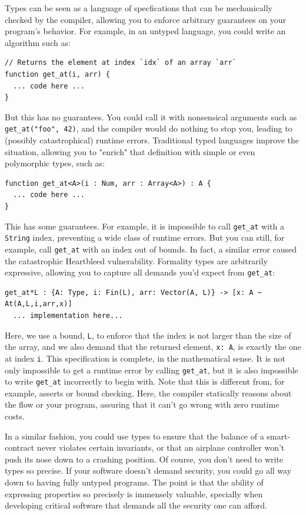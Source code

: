 \documentclass{article}
\theoremstyle{definition}
\theoremstyle{theorem}
\begin{document}
Types can be seen as a language of specfications that can be mechanically
checked by the compiler, allowing you to enforce arbitrary guarantees on your
program's behavior. For example, in an untyped language, you could write an
algorithm such as:

\begin{lstlisting}
// Returns the element at index `idx` of an array `arr`
function get_at(i, arr) {
  ... code here ...
}
\end{lstlisting}

But this has no guarantees. You could call it with nonsensical arguments such as
\verb|get_at("foo", 42)|, and the compiler would do nothing to stop you, leading
to (possibly catastrophical) runtime errors. Traditional typed languages improve
the situation, allowing you to "enrich" that definition with simple or even
polymorphic types, such as:

\begin{lstlisting}
function get_at<A>(i : Num, arr : Array<A>) : A {
  ... code here ...
}
\end{lstlisting}

This has some guarantees. For example, it is impossible to call \verb|get_at|
with a \verb|String| index, preventing a wide class of runtime errors. But you
can still, for example, call \verb|get_at| with an index out of bounds. In fact,
a similar error caused the catastrophic Heartbleed vulnerability. Formality
types are arbitrarily expressive, allowing you to capture all demands you'd
expect from \verb|get_at|:

\begin{lstlisting}
get_at*L : {A: Type, i: Fin(L), arr: Vector(A, L)} -> [x: A ~ At(A,L,i,arr,x)]
  ... implementation here...
\end{lstlisting}

Here, we use a bound, \verb|L|, to enforce that the index is not larger than the
size of the array, and we also demand that the returned element, \verb|x: A|, is
exactly the one at index \verb|i|. This specification is complete, in the
mathematical sense. It is not only impossible to get a runtime error by calling
\verb|get_at|, but it is also impossible to write \verb|get_at| incorrectly to
begin with.  Note that this is different from, for example, asserts or bound
checking.  Here, the compiler statically reasons about the flow or your program,
assuring that it can't go wrong with zero runtime costs.

In a similar fashion, you could use types to ensure that the balance of a
smart-contract never violates certain invariants, or that an airplane controller
won't push its nose down to a crashing position. Of course, you don't need to
write types so precise. If your software doesn't demand security, you could go
all way down to having fully untyped programs. The point is that the ability of
expressing properties so precisely is immensely valuable, specially when
developing critical software that demands all the security one can afford.
\end{document}
